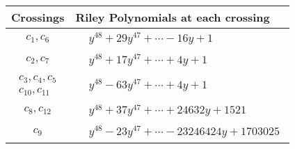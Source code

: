 \documentclass[1p]{elsarticle_modified}
\theoremstyle{definition}
\begin{document}
\begin{tabular}{m{50pt}|m{274pt}}
Crossings & \hspace{64pt}Riley Polynomials at each crossing \\
\hline $$\begin{aligned}c_{1},c_{6}\end{aligned}$$&$\begin{aligned}
&y^{48}+29 y^{47}+\cdots-16 y+1
\end{aligned}$\\
\hline $$\begin{aligned}c_{2},c_{7}\end{aligned}$$&$\begin{aligned}
&y^{48}+17 y^{47}+\cdots+4 y+1
\end{aligned}$\\
\hline $$\begin{aligned}c_{3},c_{4},c_{5}\\c_{10},c_{11}\end{aligned}$$&$\begin{aligned}
&y^{48}-63 y^{47}+\cdots+4 y+1
\end{aligned}$\\
\hline $$\begin{aligned}c_{8},c_{12}\end{aligned}$$&$\begin{aligned}
&y^{48}+37 y^{47}+\cdots+24632 y+1521
\end{aligned}$\\
\hline $$\begin{aligned}c_{9}\end{aligned}$$&$\begin{aligned}
&y^{48}-23 y^{47}+\cdots-23246424 y+1703025
\end{aligned}$\\
\hline
\end{tabular}
\vskip 2pc
\end{document}
